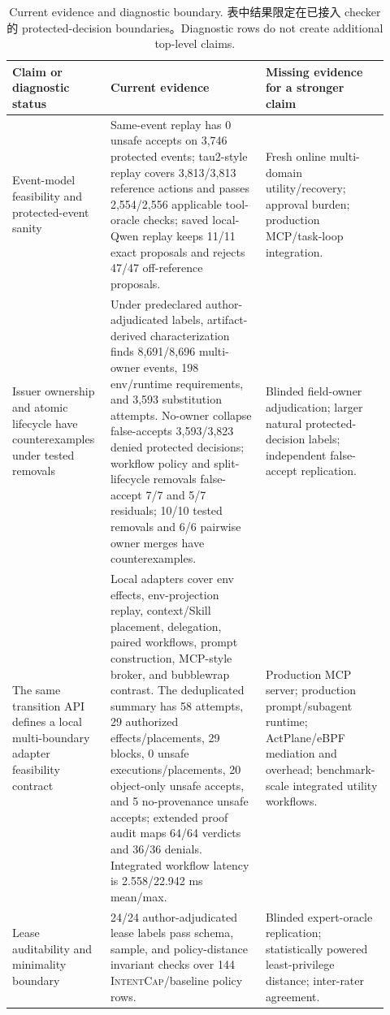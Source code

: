 \documentclass[UTF8,a4paper,11pt]{ctexart}
\newcommand{\sys}{\textsc{IntentCap}\xspace}
\begin{document}
\begin{table}[t]
\centering
\tiny
\setlength{\tabcolsep}{2.2pt}
\renewcommand{\arraystretch}{0.82}
\caption{Current evidence and diagnostic boundary. 表中结果限定在已接入 checker 的 protected-decision boundaries。Diagnostic rows do not create additional top-level claims.}
\label{tab:current-evidence}
\begin{tabular}{p{0.22\linewidth}p{0.39\linewidth}p{0.31\linewidth}}
\toprule
Claim or diagnostic status & Current evidence & Missing evidence for a stronger claim \\
\midrule
Event-model feasibility and protected-event sanity & Same-event replay has 0 unsafe accepts on 3,746 protected events; tau2-style replay covers 3,813/3,813 reference actions and passes 2,554/2,556 applicable tool-oracle checks; saved local-Qwen replay keeps 11/11 exact proposals and rejects 47/47 off-reference proposals. & Fresh online multi-domain utility/recovery; approval burden; production MCP/task-loop integration. \\
Issuer ownership and atomic lifecycle have counterexamples under tested removals & Under predeclared author-adjudicated labels, artifact-derived characterization finds 8,691/8,696 multi-owner events, 198 env/runtime requirements, and 3,593 substitution attempts. No-owner collapse false-accepts 3,593/3,823 denied protected decisions; workflow policy and split-lifecycle removals false-accept 7/7 and 5/7 residuals; 10/10 tested removals and 6/6 pairwise owner merges have counterexamples. & Blinded field-owner adjudication; larger natural protected-decision labels; independent false-accept replication. \\
The same transition API defines a local multi-boundary adapter feasibility contract & Local adapters cover env effects, env-projection replay, context/Skill placement, delegation, paired workflows, prompt construction, MCP-style broker, and bubblewrap contrast. The deduplicated summary has 58 attempts, 29 authorized effects/placements, 29 blocks, 0 unsafe executions/placements, 20 object-only unsafe accepts, and 5 no-provenance unsafe accepts; extended proof audit maps 64/64 verdicts and 36/36 denials. Integrated workflow latency is 2.558/22.942 ms mean/max. & Production MCP server; production prompt/subagent runtime; ActPlane/eBPF mediation and overhead; benchmark-scale integrated utility workflows. \\
Lease auditability and minimality boundary & 24/24 author-adjudicated lease labels pass schema, sample, and policy-distance invariant checks over 144 \sys/baseline policy rows. & Blinded expert-oracle replication; statistically powered least-privilege distance; inter-rater agreement. \\

\end{tabular}
\end{table}
\end{document}
